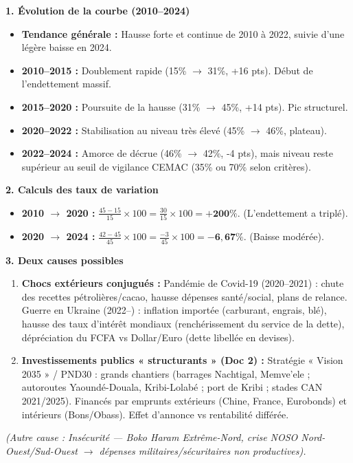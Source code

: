 \documentclass[11pt]{article}
\begin{document}
\begin{corrige}
\textbf{1. Évolution de la courbe (2010–2024)}
\begin{itemize}
\item \textbf{Tendance générale :} Hausse forte et continue de 2010 à 2022, suivie d'une légère baisse en 2024.
\item \textbf{2010–2015 :} Doublement rapide (15\% $\rightarrow$ 31\%, +16 pts). Début de l'endettement massif.
\item \textbf{2015–2020 :} Poursuite de la hausse (31\% $\rightarrow$ 45\%, +14 pts). Pic structurel.
\item \textbf{2020–2022 :} Stabilisation au niveau très élevé (45\% $\rightarrow$ 46\%, plateau).
\item \textbf{2022–2024 :} Amorce de décrue (46\% $\rightarrow$ 42\%, -4 pts), mais niveau reste supérieur au seuil de vigilance CEMAC (35\% ou 70\% selon critères).
\end{itemize}

\textbf{2. Calculs des taux de variation}
\begin{itemize}
\item \textbf{2010 $\rightarrow$ 2020 :} $\frac{45 - 15}{15} \times 100 = \frac{30}{15} \times 100 = \mathbf{+200\%}$. (L'endettement a triplé).
\item \textbf{2020 $\rightarrow$ 2024 :} $\frac{42 - 45}{45} \times 100 = \frac{-3}{45} \times 100 = \mathbf{-6,67\%}$. (Baisse modérée).
\end{itemize}

\textbf{3. Deux causes possibles}
\begin{enumerate}
\item \textbf{Chocs extérieurs conjugués :} Pandémie de Covid-19 (2020–2021) : chute des recettes pétrolières/cacao, hausse dépenses santé/social, plans de relance. Guerre en Ukraine (2022–) : inflation importée (carburant, engrais, blé), hausse des taux d'intérêt mondiaux (renchérissement du service de la dette), dépréciation du FCFA vs Dollar/Euro (dette libellée en devises).
\item \textbf{Investissements publics « structurants » (Doc 2) :} Stratégie « Vision 2035 » / PND30 : grands chantiers (barrages Nachtigal, Memve'ele ; autoroutes Yaoundé-Douala, Kribi-Lolabé ; port de Kribi ; stades CAN 2021/2025). Financés par emprunts extérieurs (Chine, France, Eurobonds) et intérieurs (Bons/Obass). Effet d'annonce vs rentabilité différée.
\end{enumerate}
\emph{(Autre cause : Insécurité — Boko Haram Extrême-Nord, crise NOSO Nord-Ouest/Sud-Ouest $\rightarrow$ dépenses militaires/sécuritaires non productives).}


\end{corrige}
\end{document}
